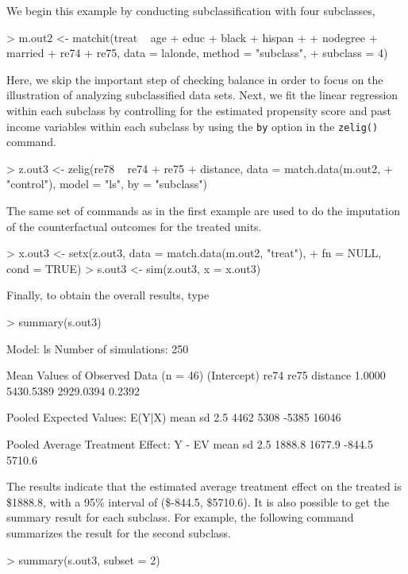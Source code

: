 \begin{enumerate}
  We begin this example by conducting subclassification with four subclasses,
\begin{Schunk}
\begin{Sinput}
> m.out2 <- matchit(treat ~ age + educ + black + hispan + 
+     nodegree + married + re74 + re75, data = lalonde, method = "subclass", 
+     subclass = 4)
\end{Sinput}
\end{Schunk}
Here, we skip the important step of checking balance in order to focus
on the illustration of analyzing subclassified data sets.  Next, we
fit the linear regression within each subclass by controlling for the
estimated propensity score and past income variables within each
subclass by using the {\tt by} option in the {\tt zelig()} command. 
\begin{Schunk}
\begin{Sinput}
> z.out3 <- zelig(re78 ~ re74 + re75 + distance, data = match.data(m.out2, 
+     "control"), model = "ls", by = "subclass")
\end{Sinput}
\end{Schunk}
The same set of commands as in the first example are used to
do the imputation of the counterfactual outcomes for the treated
units.
\begin{Schunk}
\begin{Sinput}
> x.out3 <- setx(z.out3, data = match.data(m.out2, "treat"), 
+     fn = NULL, cond = TRUE)
> s.out3 <- sim(z.out3, x = x.out3)
\end{Sinput}
\end{Schunk}
Finally, to obtain the overall results, type
\begin{Schunk}
\begin{Sinput}
> summary(s.out3)
\end{Sinput}
\begin{Soutput}

  Model: ls 
  Number of simulations: 250 

Mean Values of Observed Data (n = 46) 
(Intercept)        re74        re75    distance 
     1.0000   5430.5389   2929.0394      0.2392 

Pooled Expected Values: E(Y|X)
 mean    sd  2.5% 97.5% 
 4462  5308 -5385 16046 

Pooled Average Treatment Effect: Y - EV
  mean     sd   2.5%  97.5% 
1888.8 1677.9 -844.5 5710.6 

\end{Soutput}
\end{Schunk}
The results indicate that the estimated average treatment effect on
the treated is
\$1888.8,
with a 95\% interval of
(\$-844.5,
\$5710.6).
It is also possible to get the summary result for each subclass. For
example, the following command summarizes the result for the second
subclass.
\begin{Schunk}
\begin{Sinput}
> summary(s.out3, subset = 2)
\end{Sinput}
\begin{Soutput}


\end{Soutput}
\end{Schunk}
\end{enumerate}
